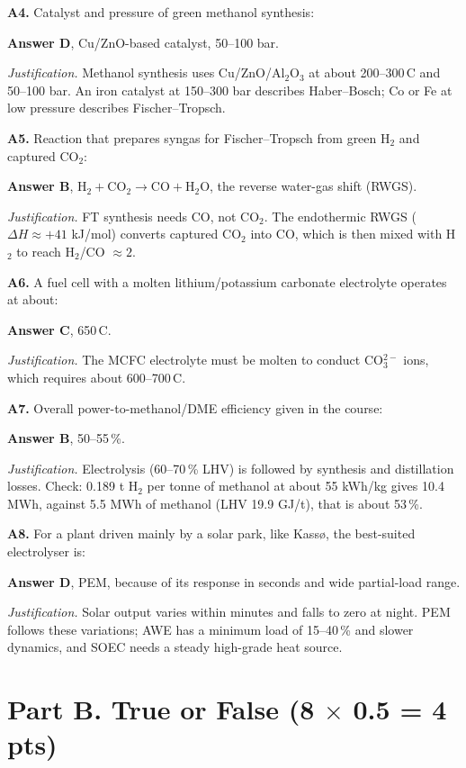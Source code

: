 \documentclass[11pt,a4paper]{article}
\newcommand{\degC}{\,\textdegree C}
\newcommand{\q}[2]{\par\medskip\textbf{#1.} #2\par}
\newcommand{\answer}[2]{\textcolor{ans}{\textbf{Answer #1}}, #2\par}
\newcommand{\why}[1]{\textit{Justification.} #1\par}
\newcommand{\pts}[1]{\hfill{\normalsize\textbf{(#1)}}}
\begin{document}
\q{A4}{Catalyst and pressure of green methanol synthesis:}
\answer{D}{Cu/ZnO-based catalyst, 50--100 bar.}
\why{Methanol synthesis uses Cu/ZnO/Al$_2$O$_3$ at about 200--300\degC{} and 50--100 bar. An iron catalyst at
150--300 bar describes Haber--Bosch; Co or Fe at low pressure describes Fischer--Tropsch.}

\q{A5}{Reaction that prepares syngas for Fischer--Tropsch from green H$_2$ and captured CO$_2$:}
\answer{B}{$\mathrm{H_2 + CO_2 \longrightarrow CO + H_2O}$, the reverse water-gas shift (RWGS).}
\why{FT synthesis needs CO, not CO$_2$. The endothermic RWGS ($\Delta H \approx +41$ kJ/mol) converts captured
CO$_2$ into CO, which is then mixed with H$_2$ to reach H$_2$/CO $\approx 2$.}

\q{A6}{A fuel cell with a molten lithium/potassium carbonate electrolyte operates at about:}
\answer{C}{650\degC.}
\why{The MCFC electrolyte must be molten to conduct CO$_3^{2-}$ ions, which requires about 600--700\degC.}

\q{A7}{Overall power-to-methanol/DME efficiency given in the course:}
\answer{B}{50--55\,\%.}
\why{Electrolysis (60--70\,\% LHV) is followed by synthesis and distillation losses. Check: 0.189 t H$_2$ per tonne
of methanol at about 55 kWh/kg gives 10.4 MWh, against 5.5 MWh of methanol (LHV 19.9 GJ/t), that is about
53\,\%.}

\q{A8}{For a plant driven mainly by a solar park, like Kassø, the best-suited electrolyser is:}
\answer{D}{PEM, because of its response in seconds and wide partial-load range.}
\why{Solar output varies within minutes and falls to zero at night. PEM follows these variations; AWE has a
minimum load of 15--40\,\% and slower dynamics, and SOEC needs a steady high-grade heat source.}

\section{Part B. True or False \pts{8 $\times$ 0.5 = 4 pts}}
\end{document}
